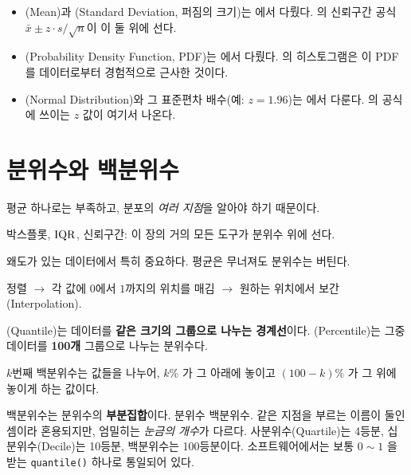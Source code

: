 \begin{itemize}
  \item {}(Mean)과 (Standard Deviation, 퍼짐의 크기)는
        에서 다뤘다. 의 신뢰구간
        공식 $\bar{x} \pm z \cdot s/\sqrt{n}$이 이 둘 위에 선다.
  \item {}(Probability Density Function, PDF)는
        에서 다뤘다. 의 히스토그램은
        이 PDF를 데이터로부터 경험적으로 근사한 것이다.
  \item {}(Normal Distribution)와 그 표준편차 배수(예:
        $z=1.96$)는 에서 다룬다. 의 공식에
        쓰이는 $z$ 값이 여기서 나온다.
\end{itemize}

\section{분위수와 백분위수}
\label{sec:quantile}

\begin{inbrief}
  \item[Why] 평균 하나로는 부족하고, 분포의 \emph{여러 지점}을 알아야 하기 때문이다.
  \item[When] 박스플롯, $\mathrm{IQR}$, 신뢰구간: 이 장의 거의 모든 도구가 분위수 위에 선다.
  \item[Where] 왜도가 있는 데이터에서 특히 중요하다. 평균은 무너져도 분위수는 버틴다.
  \item[How] 정렬 $\rightarrow$ 각 값에 $0$에서 $1$까지의 위치를 매김 $\rightarrow$
             원하는 위치에서 보간(Interpolation).
\end{inbrief}

\begin{definition}
\label{def:quantile}
(Quantile)는 데이터를 \textbf{같은 크기의 그룹으로 나누는 경계선}이다.
(Percentile)는 그중 데이터를 \textbf{100개} 그룹으로 나누는 분위수다.

$k$번째 백분위수는 값들을 나누어, $k\%$ 가 그 아래에 놓이고 $(100-k)\%$ 가 그
위에 놓이게 하는 값이다.
\end{definition}

\begin{aside}[둘의 관계]
백분위수는 분위수의 \textbf{부분집합}이다. 분위수 \contains{} 백분위수.
같은 지점을 부르는 이름이 둘인 셈이라 혼용되지만, 엄밀히는 \emph{눈금의 개수}가
다르다. 사분위수(Quartile)는 4등분, 십분위수(Decile)는 10등분, 백분위수는
100등분이다. 소프트웨어에서는 보통 $0 \sim 1$ 을 받는 \texttt{quantile()} 하나로
통일되어 있다.
\end{aside}

